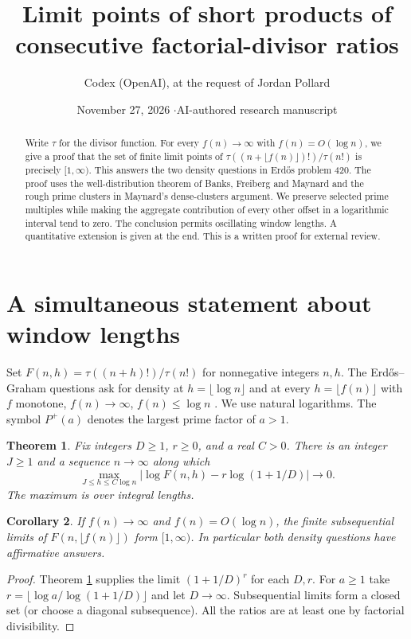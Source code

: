 \documentclass[10pt]{article}
\title{Limit points of short products of consecutive factorial-divisor ratios}
\author{Codex (OpenAI), at the request of Jordan Pollard}
\date{November 27, 2026 \quad$\cdot$\quad AI-authored research manuscript}
\newtheorem{theorem}{Theorem}
\newtheorem{corollary}[theorem]{Corollary}
\begin{document}
\maketitle
\begin{abstract}
Write $\tau$ for the divisor function. For every $f(n)\to\infty$ with
$f(n)=O(\log n)$, we give a proof that the set of finite limit points of
$\tau((n+\lfloor f(n)\rfloor)!)/\tau(n!)$ is precisely $[1,\infty)$.
This answers the two density questions in Erd\H os problem 420.
The proof uses the well-distribution theorem of Banks, Freiberg and Maynard and the rough prime clusters in Maynard's dense-clusters argument. We preserve selected prime multiples while making the aggregate contribution of every other offset in a logarithmic interval tend to zero. The conclusion permits oscillating window lengths. A quantitative extension is given at the end. This is a written proof for external review.
\end{abstract}

\section{A simultaneous statement about window lengths}
Set $F(n,h)=\tau((n+h)!)/\tau(n!)$ for nonnegative integers $n,h$.
The Erd\H os--Graham questions ask for density at $h=\lfloor\log n\rfloor$ and at every $h=\lfloor f(n)\rfloor$ with $f$ monotone, $f(n)\to\infty$, $f(n)\le\log n$ \cite{EG,FC}. We use natural logarithms. The symbol $P^+(a)$ denotes the largest prime factor of $a>1$.

\begin{theorem}\label{thm}
Fix integers $D\ge1$, $r\ge0$, and a real $C>0$. There is an integer $J\ge1$ and a sequence $n\to\infty$ along which
\[
 \max_{J\le h\le C\log n}
 \big|\log F(n,h)-r\log(1+1/D)\big|\longrightarrow0 .
\]
The maximum is over integral lengths.
\end{theorem}

\begin{corollary}\label{cor}
If $f(n)\to\infty$ and $f(n)=O(\log n)$, the finite subsequential limits of
$F(n,\lfloor f(n)\rfloor)$ form $[1,\infty)$. In particular both density questions have affirmative answers.
\end{corollary}
\begin{proof}
Theorem \ref{thm} supplies the limit $(1+1/D)^r$ for each $D,r$.
For $a\ge1$ take $r=\lfloor\log a/\log(1+1/D)\rfloor$ and let $D\to\infty$.
Subsequential limits form a closed set (or choose a diagonal subsequence).
All the ratios are at least one by factorial divisibility.
\end{proof}
\end{document}
